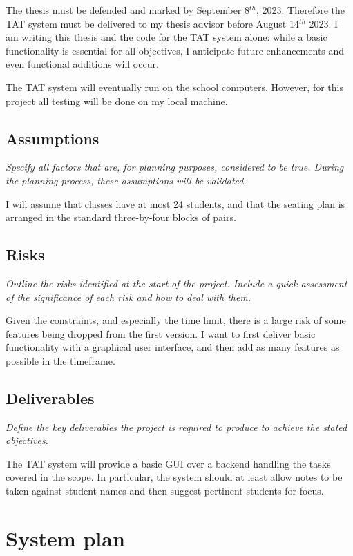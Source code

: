 \documentclass[10pt]{article}
\begin{document}
The thesis must be defended and marked by September 8$^{th}$, 2023. Therefore the TAT system must be delivered to my thesis advisor before August 14$^{th}$ 2023. I am writing this thesis and the code for the TAT system alone: while a basic functionality is essential for all objectives, I anticipate future enhancements and even functional additions will occur.

The TAT system will eventually run on the school computers. However, for this project all testing will be done on my local machine.

\subsection{Assumptions} 
\emph{Specify all factors that are, for planning purposes, considered to be true. During the planning process, these assumptions will be validated.}

I will assume that classes have at most 24 students, and that the seating plan is arranged in the standard three-by-four blocks of pairs.

\subsection{Risks} 
\emph{Outline the risks identified at the start of the project. Include a quick assessment of the significance of each risk and how to deal with them.}

Given the constraints, and especially the time limit, there is a large risk of some features being dropped from the first version. I want to first deliver basic functionality with a graphical user interface, and then add as many features as possible in the timeframe.

\subsection{Deliverables} \label{deliverables}
\emph{Define the key deliverables the project is required to produce to achieve the stated objectives.}

The TAT system will provide a basic GUI over a backend handling the tasks covered in the scope. In particular, the system should at least allow notes to be taken against student names and then suggest pertinent students for focus.

\section{System plan} \label{inout}
\end{document}
